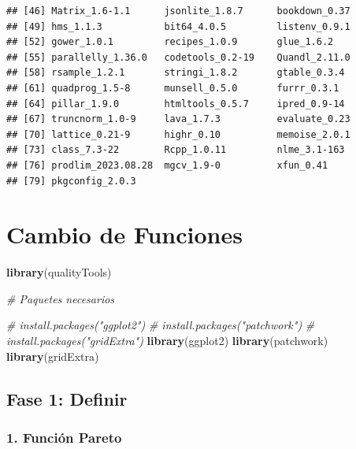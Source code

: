\documentclass[
]{book}
\newenvironment{Shaded}{\begin{snugshade}}{\end{snugshade}}
\newcommand{\CommentTok}[1]{\textcolor[rgb]{0.56,0.35,0.01}{\textit{#1}}}
\newcommand{\FunctionTok}[1]{\textcolor[rgb]{0.13,0.29,0.53}{\textbf{#1}}}
\newcommand{\NormalTok}[1]{#1}
\begin{document}
\begin{verbatim}
## [46] Matrix_1.6-1.1      jsonlite_1.8.7      bookdown_0.37      
## [49] hms_1.1.3           bit64_4.0.5         listenv_0.9.1      
## [52] gower_1.0.1         recipes_1.0.9       glue_1.6.2         
## [55] parallelly_1.36.0   codetools_0.2-19    Quandl_2.11.0      
## [58] rsample_1.2.1       stringi_1.8.2       gtable_0.3.4       
## [61] quadprog_1.5-8      munsell_0.5.0       furrr_0.3.1        
## [64] pillar_1.9.0        htmltools_0.5.7     ipred_0.9-14       
## [67] truncnorm_1.0-9     lava_1.7.3          evaluate_0.23      
## [70] lattice_0.21-9      highr_0.10          memoise_2.0.1      
## [73] class_7.3-22        Rcpp_1.0.11         nlme_3.1-163       
## [76] prodlim_2023.08.28  mgcv_1.9-0          xfun_0.41          
## [79] pkgconfig_2.0.3
\end{verbatim}

\hypertarget{cambio-de-funciones}{%
\chapter{Cambio de Funciones}\label{cambio-de-funciones}}

\begin{Shaded}
\begin{Highlighting}[]
\FunctionTok{library}\NormalTok{(qualityTools)}

\CommentTok{\# Paquetes necesarios}

\CommentTok{\# install.packages("ggplot2")}
\CommentTok{\# install.packages("patchwork")}
\CommentTok{\# install.packages("gridExtra")}
\FunctionTok{library}\NormalTok{(ggplot2)}
\FunctionTok{library}\NormalTok{(patchwork)}
\FunctionTok{library}\NormalTok{(gridExtra)}
\end{Highlighting}
\end{Shaded}

\hypertarget{fase-1-definir-1}{%
\section{Fase 1: Definir}\label{fase-1-definir-1}}

\hypertarget{funciuxf3n-pareto}{%
\subsection{1. Función Pareto}\label{funciuxf3n-pareto}}
\end{document}
